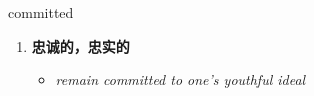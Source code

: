 
\begin{frame}
{\huge committed}
\begin{center}
\begin{enumerate}\Large
  \item \textbf{忠诚的，忠实的}
  \begin{itemize}
    \item \em{\Large{remain committed to one's youthful ideal}}
  \end{itemize}
\end{enumerate}
\end{center}
\end{frame}
